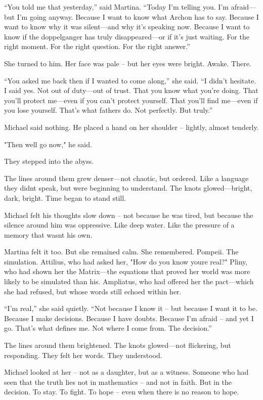 \documentclass[
]{article}
\begin{document}
``You told me that yesterday,'' said Martina. ``Today I'm telling you. I'm afraid---but I'm going anyway. Because I want to know what Archon has to say. Because I want to know why it was silent---and why it's speaking now. Because I want to know if the doppelganger has truly disappeared---or if it's just waiting. For the right moment. For the right question. For the right answer.''

She turned to him. Her face was pale -- but her eyes were bright. Awake. There.

``You asked me back then if I wanted to come along,'' she said. ``I didn't hesitate. I said yes. Not out of duty---out of trust. That you know what you're doing. That you'll protect me---even if you can't protect yourself. That you'll find me---even if you lose yourself. That's what fathers do. Not perfectly. But truly.''

Michael said nothing. He placed a hand on her shoulder -- lightly, almost tenderly.

"Then we\textquotesingle ll go now," he said.

They stepped into the abyss.

The lines around them grew denser---not chaotic, but ordered. Like a language they didn\textquotesingle t speak, but were beginning to understand. The knots glowed---bright, dark, bright. Time began to stand still.

Michael felt his thoughts slow down -- not because he was tired, but because the silence around him was oppressive. Like deep water. Like the pressure of a memory that wasn\textquotesingle t his own.

Martina felt it too. But she remained calm. She remembered. Pompeii. The simulation. Attilius, who had asked her, "How do you know you\textquotesingle re real?" Pliny, who had shown her the Matrix---the equations that proved her world was more likely to be simulated than his. Ampliatus, who had offered her the pact---which she had refused, but whose words still echoed within her.

``I'm real,'' she said quietly. ``Not because I know it -- but because I want it to be. Because I make decisions. Because I have doubts. Because I'm afraid -- and yet I go. That's what defines me. Not where I come from. The decision.''

The lines around them brightened. The knots glowed---not flickering, but responding. They felt her words. They understood.

Michael looked at her -- not as a daughter, but as a witness. Someone who had seen that the truth lies not in mathematics -- and not in faith. But in the decision. To stay. To fight. To hope -- even when there is no reason to hope.
\end{document}
